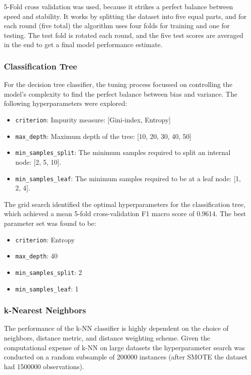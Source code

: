 \documentclass[conference]{IEEEtran}
\begin{document}
5-Fold cross validation was used, because it strikes a perfect balance between speed and stability. It works by splitting the dataset into five equal parts, and for each round (five total) the algorithm uses four folds for training and one for testing. The test fold is rotated each round, and the five test scores are averaged in the end to get a final model performance estimate.

\subsubsection{\textbf{Classification Tree}}

For the decision tree classifier, the tuning process focussed on controlling the model's complexity to find the perfect balance between bias and variance. The following hyperparameters were explored:

\begin{itemize}
    \item \texttt{criterion}: Impurity measure: [Gini-index, Entropy]
    \item \texttt{max\_depth}: Maximum depth of the tree: [10, 20, 30, 40, 50]
    \item \texttt{min\_samples\_split}: The minimum samples required to split an internal node: [2, 5, 10].
    \item \texttt{min\_samples\_leaf}: The minimum samples required to be at a leaf node: [1, 2, 4].
\end{itemize}

The grid search identified the optimal hyperparameters for the classification tree, which achieved a mean 5-fold cross-validation F1 macro score of 0.9614. The best parameter set was found to be:

\begin{itemize}
    \item \texttt{criterion}: Entropy
    \item \texttt{max\_depth}: 40
    \item \texttt{min\_samples\_split}: 2
    \item \texttt{min\_samples\_leaf}: 1
\end{itemize}

\subsubsection{\textbf{k-Nearest Neighbors}}

The performance of the k-NN classifier is highly dependent on the choice of neighbors, distance metric, and distance weighting scheme. Given the computational expense of k-NN on large datasets the hyperparameter search was conducted on a random subsample of 200000 instances (after SMOTE the dataset had 1500000 observations).
\end{document}

